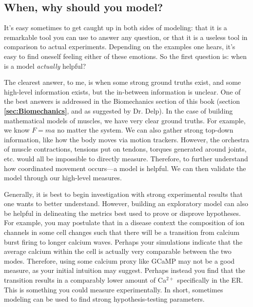 \subsection{When, why should you model?}

It's easy sometimes to get caught up in both sides of modeling: that it is a remarkable tool you can use to answer any question, or that it is a useless tool in comparison to actual experiments. Depending on the examples one hears, it's easy to find oneself feeling either of these emotions. So the first question is: when is a model \textit{actually} helpful?\newline

The clearest answer, to me, is when some strong ground truths exist, and some high-level information exists, but the in-between information is unclear. One of the best answers is addressed in the Biomechanics section of this book (section \textbf{\ref{sec:Biomechanics}}, and as suggested by Dr. Delp). In the case of building mathematical models of muscles, we have very clear ground truths. For example, we know $F = ma$ no matter the system. We can also gather strong top-down information, like how the body moves via motion trackers. However, the orchestra of muscle contractions, tensions put on tendons, torques generated around joints, etc. would all be impossible to directly measure. Therefore, to further understand how coordinated movement occurs---a model is helpful. We can then validate the model through our high-level measures.\newline

Generally, it is best to begin investigation with strong experimental results that one wants to better understand. However, building an exploratory model can also be helpful in delineating the metrics best used to prove or disprove hypotheses. For example, you may postulate that in a disease context the composition of ion channels in some cell changes such that there will be a transition from calcium burst firing to longer calcium waves. Perhaps your simulations indicate that the average calcium within the cell is actually very comparable between the two modes. Therefore, using some calcium proxy like GCaMP may not be a good measure, as your initial intuition may suggest. Perhaps instead you find that the transition results in a comparably lower amount of Ca$^{2+}$ specifically in the ER. This is something you could measure experimentally. In short, sometimes modeling can be used to find strong hypothesis-testing parameters. 



